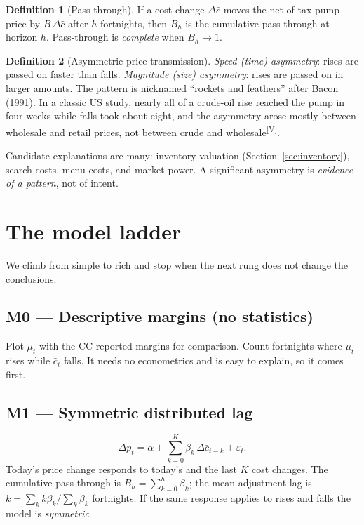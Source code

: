 \documentclass[11pt,a4paper]{article}
\newcommand{\tagV}{\textsuperscript{\textcolor{green!50!black}{\textsf{\scriptsize[V]}}}}
\theoremstyle{definition}
\newtheorem{definition}{Definition}[section]
\begin{document}
\begin{definition}[Pass-through]
If a cost change $\Delta\bar c$ moves the net-of-tax pump price by $B\,\Delta\bar c$ after $h$ fortnights, then $B_h$ is the cumulative pass-through at horizon $h$.
Pass-through is \emph{complete} when $B_h\to 1$.
\end{definition}

\begin{definition}[Asymmetric price transmission]
\emph{Speed (time) asymmetry}: rises are passed on faster than falls. \emph{Magnitude (size) asymmetry}: rises are passed on in larger amounts. The
pattern is nicknamed ``rockets and feathers'' after Bacon (1991)\cite{bac91}. In a classic US study, nearly all of a crude-oil rise reached the pump in four weeks while falls took about eight, and the asymmetry arose mostly between wholesale and
retail prices, not between crude and wholesale\tagV\cite{bcg97}.
\end{definition}

Candidate explanations are many: inventory valuation (Section~\ref{sec:inventory}), search costs, menu costs, and market power. A significant asymmetry is
\emph{evidence of a pattern}, not of intent.

\section{The model ladder}

We climb from simple to rich and stop when the next rung does not change the conclusions.

\subsection*{M0 --- Descriptive margins (no statistics)}
Plot $\mu_t$ with the CC-reported margins for comparison. Count fortnights where $\mu_t$ rises while $\bar c_t$ falls. It needs no econometrics and is easy to explain, so
it comes first.

\subsection*{M1 --- Symmetric distributed lag}
\begin{equation}\label{eq:m1}
\Delta p_t = \alpha + \sum_{k=0}^{K}\beta_k\,\Delta\bar c_{t-k} + \varepsilon_t .
\end{equation}
Today's price change responds to today's and the last $K$ cost changes. The cumulative pass-through is $B_h=\sum_{k=0}^h\beta_k$; the mean adjustment lag is
$\bar k = \sum_k k\beta_k/\sum_k\beta_k$ fortnights. If the same response applies to rises and falls the model is \emph{symmetric}.
\end{document}
